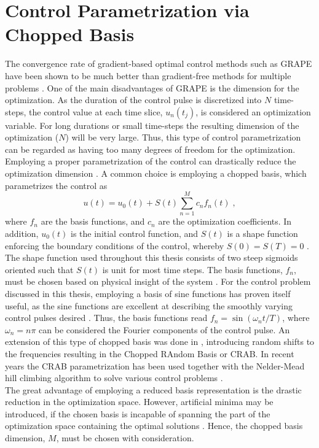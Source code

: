 \section{Control Parametrization via Chopped Basis} \label{sec:GROUP}
The convergence rate of gradient-based optimal control methods such as GRAPE have been shown to be much better than gradient-free methods for multiple problems \cite{Jager2014, sorensen2018}.
One of the main disadvantages of GRAPE is the dimension for the optimization. As the duration of the control pulse is discretized into $N$ time-steps, the control value at each time slice, $u_n (t_j)$, is considered an optimization variable. For long durations or small time-steps the resulting dimension of the optimization ($N$) will be very large. Thus, this type of control parametrization can be regarded as having too many degrees of freedom for the optimization.\\
Employing a proper parametrization of the control can drastically reduce the optimization dimension \cite{Winckel2008}.
A common choice is employing a chopped basis, which parametrizes the control as
\begin{equation}
	u(t) = u_0 (t) + S(t) \sum_{n=1}^{M} c_n f_n (t) \; , \label{eq:controlParametrization}
\end{equation}   
where $f_n$ are the basis functions, and $c_n$ are the optimization coefficients. In addition, $u_0 (t)$ is the initial control function, and $S (t)$ is a shape function enforcing the boundary conditions of the control, whereby $S(0) = S(T) = 0$ \cite{sorensen2018}. The shape function used throughout this thesis consists of two steep sigmoids oriented such that $S(t)$ is unit for most time steps. The basis functions, $f_n$, must be chosen based on physical insight of the system \cite{Ruths2012}. For the control problem discussed in this thesis, employing a basis of sine functions has proven itself useful, as the sine functions are excellent at describing the smoothly varying control pulses desired \cite{sorensen2018,Jiang2009}. Thus, the basis functions read $f_n = \sin \left( \omega_n t / T \right)$, where $\omega_n = n \pi$ can be considered the Fourier components of the control pulse.
An extension of this type of chopped basis was done in \cite{Doria2011,Caneva2011crab}, introducing random shifts to the frequencies resulting in the Chopped RAndom Basis or \textsc{CRAB}. In recent years the \textsc{CRAB} parametrization has been used together with the Nelder-Mead hill climbing algorithm to solve various control problems \cite{Doria2011,Caneva2011,FrankBloch,Lloyd2014}.\\
The great advantage of employing a reduced basis representation is the drastic reduction in the optimization space. However, artificial minima may be introduced, if the chosen basis is incapable of spanning the part of the optimization space containing the optimal solutions \cite{Rach2015}. Hence, the chopped basis dimension, $M$, must be chosen with consideration.


